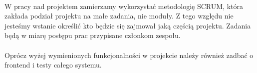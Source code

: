 \documentclass[wide,a4paper,titlepage,12pt] {article}
\begin{document}
  \paragraph{}
  W pracy nad projektem zamierzamy wykorzystać metodologię SCRUM, która zakłada podział projektu na małe zadania, nie moduły. Z tego względu nie jesteśmy wstanie określić kto będzie się zajmował jaką częścią projektu. Zadania będą w miarę postępu prac przypisane członkom zespołu.
  \paragraph{}
  Oprócz wyżej wymienionych funkcjonalności w projekcie należy również zadbać o frontend i testy całego systemu. 


  
\end{document}
